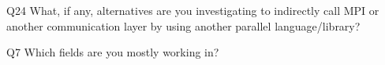 \begin{description}%
\item{Q24} What, if any, alternatives are you investigating to indirectly call MPI or another communication layer by using another parallel language/library?%
\item{Q7} Which fields are you mostly working in?%
\end{description}%
